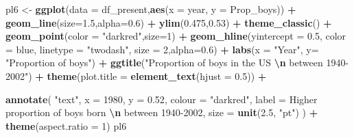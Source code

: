 \documentclass[11pt,a4paper,]{article}
\newenvironment{Shaded}{\begin{snugshade}}{\end{snugshade}}
\newcommand{\AttributeTok}[1]{\textcolor[rgb]{0.13,0.29,0.53}{#1}}
\newcommand{\DecValTok}[1]{\textcolor[rgb]{0.00,0.00,0.81}{#1}}
\newcommand{\FloatTok}[1]{\textcolor[rgb]{0.00,0.00,0.81}{#1}}
\newcommand{\FunctionTok}[1]{\textcolor[rgb]{0.13,0.29,0.53}{\textbf{#1}}}
\newcommand{\NormalTok}[1]{#1}
\newcommand{\OtherTok}[1]{\textcolor[rgb]{0.56,0.35,0.01}{#1}}
\newcommand{\SpecialCharTok}[1]{\textcolor[rgb]{0.81,0.36,0.00}{\textbf{#1}}}
\newcommand{\StringTok}[1]{\textcolor[rgb]{0.31,0.60,0.02}{#1}}
\begin{document}
\begin{Shaded}
\begin{Highlighting}[]
\NormalTok{pl6 }\OtherTok{\textless{}{-}} \FunctionTok{ggplot}\NormalTok{(}\AttributeTok{data =}\NormalTok{ df\_present,}\FunctionTok{aes}\NormalTok{(}\AttributeTok{x =}\NormalTok{ year, }\AttributeTok{y =}\NormalTok{ Prop\_boys)) }\SpecialCharTok{+} 
  \FunctionTok{geom\_line}\NormalTok{(}\AttributeTok{size=}\FloatTok{1.5}\NormalTok{,}\AttributeTok{alpha=}\FloatTok{0.6}\NormalTok{) }\SpecialCharTok{+} \FunctionTok{ylim}\NormalTok{(}\FloatTok{0.475}\NormalTok{,}\FloatTok{0.53}\NormalTok{) }\SpecialCharTok{+} \FunctionTok{theme\_classic}\NormalTok{() }\SpecialCharTok{+} \FunctionTok{geom\_point}\NormalTok{(}\AttributeTok{color =} \StringTok{"darkred"}\NormalTok{,}\AttributeTok{size=}\DecValTok{1}\NormalTok{) }\SpecialCharTok{+}
  \FunctionTok{geom\_hline}\NormalTok{(}\AttributeTok{yintercept =} \FloatTok{0.5}\NormalTok{,}
             \AttributeTok{color =} \StringTok{\textquotesingle{}blue\textquotesingle{}}\NormalTok{,}
             \AttributeTok{linetype =} \StringTok{"twodash"}\NormalTok{,}
             \AttributeTok{size =} \DecValTok{2}\NormalTok{,}\AttributeTok{alpha=}\FloatTok{0.6}\NormalTok{) }\SpecialCharTok{+} \FunctionTok{labs}\NormalTok{(}\AttributeTok{x =} \StringTok{"Year"}\NormalTok{, }\AttributeTok{y=} \StringTok{"Proportion of boys"}\NormalTok{) }\SpecialCharTok{+} 
  \FunctionTok{ggtitle}\NormalTok{(}\StringTok{"Proportion of boys in the US }\SpecialCharTok{\textbackslash{}n}\StringTok{ between 1940{-}2002"}\NormalTok{) }\SpecialCharTok{+} 
  \FunctionTok{theme}\NormalTok{(}\AttributeTok{plot.title =} \FunctionTok{element\_text}\NormalTok{(}\AttributeTok{hjust =} \FloatTok{0.5}\NormalTok{)) }\SpecialCharTok{+}
  
  \FunctionTok{annotate}\NormalTok{(}
    \StringTok{"text"}\NormalTok{,}
    \AttributeTok{x =} \DecValTok{1980}\NormalTok{,}
    \AttributeTok{y =} \FloatTok{0.52}\NormalTok{,}
    \AttributeTok{colour =} \StringTok{"darkred"}\NormalTok{,}
    \AttributeTok{label =} \StringTok{\textquotesingle{}Higher proportion of boys born }\SpecialCharTok{\textbackslash{}n}\StringTok{ between 1940{-}2002\textquotesingle{}}\NormalTok{,}
    \AttributeTok{size =} \FunctionTok{unit}\NormalTok{(}\FloatTok{2.5}\NormalTok{, }\StringTok{"pt"}\NormalTok{)}
\NormalTok{  ) }\SpecialCharTok{+} \FunctionTok{theme}\NormalTok{(}\AttributeTok{aspect.ratio =} \DecValTok{1}\NormalTok{)}
\NormalTok{pl6}
\end{Highlighting}
\end{Shaded}
\end{document}
